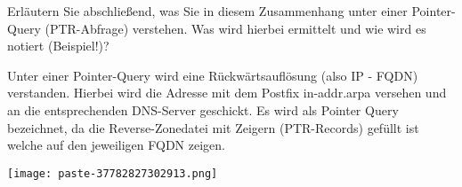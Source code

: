 \documentclass{article}
\begin{document}
\begin{tcolorbox}[colback=white!10!white,colframe=lightgray!75!black,
  savelowerto=\jobname_ex.tex,breakable,enhanced,lines before break=40]

\justifying
Erläutern Sie abschließend, was Sie in diesem Zusammenhang unter einer Pointer-Query (PTR-Abfrage) verstehen. Was wird hierbei ermittelt und wie wird es notiert (Beispiel!)?

\tcblower

\justifying
Unter einer Pointer-Query wird eine Rückwärtsauflösung (also IP - FQDN) verstanden. Hierbei wird die Adresse mit dem Postfix in-addr.arpa versehen und an die entsprechenden DNS-Server geschickt. Es wird als Pointer Query bezeichnet, da die Reverse-Zonedatei mit Zeigern (PTR-Records) gefüllt ist welche auf den jeweiligen FQDN zeigen.\begin{center}
\texttt{[image: paste-37782827302913.png]}
\end{center}

\end{tcolorbox}
\end{document}
